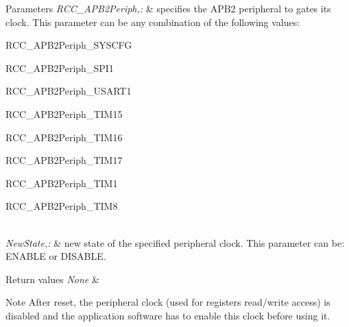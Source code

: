 \begin{DoxyParams}{Parameters}
{\em R\-C\-C\-\_\-\-A\-P\-B2\-Periph,\-:} & specifies the A\-P\-B2 peripheral to gates its clock. This parameter can be any combination of the following values\-: \begin{DoxyItemize}
\item R\-C\-C\-\_\-\-A\-P\-B2\-Periph\-\_\-\-S\-Y\-S\-C\-F\-G \item R\-C\-C\-\_\-\-A\-P\-B2\-Periph\-\_\-\-S\-P\-I1 \item R\-C\-C\-\_\-\-A\-P\-B2\-Periph\-\_\-\-U\-S\-A\-R\-T1 \item R\-C\-C\-\_\-\-A\-P\-B2\-Periph\-\_\-\-T\-I\-M15 \item R\-C\-C\-\_\-\-A\-P\-B2\-Periph\-\_\-\-T\-I\-M16 \item R\-C\-C\-\_\-\-A\-P\-B2\-Periph\-\_\-\-T\-I\-M17 \item R\-C\-C\-\_\-\-A\-P\-B2\-Periph\-\_\-\-T\-I\-M1 \item R\-C\-C\-\_\-\-A\-P\-B2\-Periph\-\_\-\-T\-I\-M8 \end{DoxyItemize}
\\
\hline
{\em New\-State,\-:} & new state of the specified peripheral clock. This parameter can be\-: E\-N\-A\-B\-L\-E or D\-I\-S\-A\-B\-L\-E. \\
\hline
\end{DoxyParams}

\begin{DoxyRetVals}{Return values}
{\em None} & \\
\hline
\end{DoxyRetVals}
\begin{DoxyNote}{Note}
After reset, the peripheral clock (used for registers read/write access) is disabled and the application software has to enable this clock before using it. 
\end{DoxyNote}


